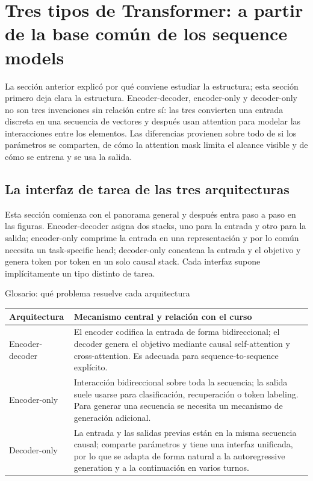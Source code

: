 \section{Tres tipos de Transformer: a partir de la base común de los sequence models}

La sección anterior explicó por qué conviene estudiar la estructura; esta sección primero deja clara la estructura. Encoder-decoder, encoder-only y decoder-only no son tres invenciones sin relación entre sí: las tres convierten una entrada discreta en una secuencia de vectores y después usan attention para modelar las interacciones entre los elementos. Las diferencias provienen sobre todo de si los parámetros se comparten, de cómo la attention mask limita el alcance visible y de cómo se entrena y se usa la salida.

\subsection{La interfaz de tarea de las tres arquitecturas}

Esta sección comienza con el panorama general y después entra paso a paso en las figuras. Encoder-decoder asigna dos stacks, uno para la entrada y otro para la salida; encoder-only comprime la entrada en una representación y por lo común necesita un task-specific head; decoder-only concatena la entrada y el objetivo y genera token por token en un solo causal stack. Cada interfaz supone implícitamente un tipo distinto de tarea.


\begin{knowledgebox}{Glosario: qué problema resuelve cada arquitectura}
\begin{tabularx}{\textwidth}{L{0.22\textwidth} X}
\toprule
Arquitectura & Mecanismo central y relación con el curso \\
\midrule
Encoder-decoder & El encoder codifica la entrada de forma bidireccional; el decoder genera el objetivo mediante causal self-attention y cross-attention. Es adecuada para sequence-to-sequence explícito. \\
Encoder-only & Interacción bidireccional sobre toda la secuencia; la salida suele usarse para clasificación, recuperación o token labeling. Para generar una secuencia se necesita un mecanismo de generación adicional. \\
Decoder-only & La entrada y las salidas previas están en la misma secuencia causal; comparte parámetros y tiene una interfaz unificada, por lo que se adapta de forma natural a la autoregressive generation y a la continuación en varios turnos. \\
\bottomrule
\end{tabularx}
\end{knowledgebox}

